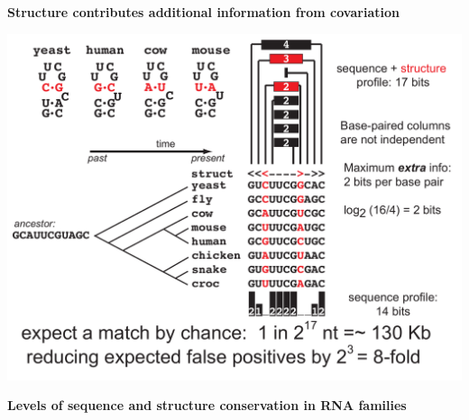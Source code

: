 \documentclass[landscape]{slides}
\begin{document}
\begin{slide}
\begin{slide}
\vfill
\end{slide}
\begin{slide}
\begin{center}
\textbf{Structure contributes additional information from covariation}
\medskip

\includegraphics[width=9in]{figs/seqstructprofiles-2014-structinfo}
\end{center}

\vfill
\end{slide}
\begin{slide}
\begin{center}
\textbf{Levels of sequence and structure conservation in RNA families}
\end{center}
\medskip


\end{slide}
\end{slide}
\end{document}
